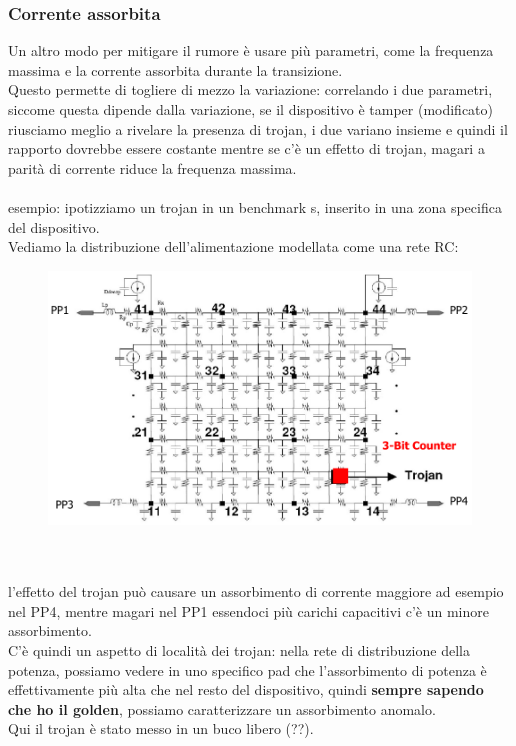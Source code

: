 \documentclass[oneside, 12pt]{extbook}
\begin{document}
\subsubsection{Corrente assorbita}
Un altro modo per mitigare il rumore è usare più parametri, come la frequenza massima e la corrente assorbita durante la transizione.
\\Questo permette di togliere di mezzo la variazione: correlando i due parametri, siccome questa dipende dalla variazione, se il dispositivo è tamper (modificato) riusciamo meglio a rivelare la presenza di trojan, i due variano insieme e quindi il rapporto dovrebbe essere costante mentre se c'è un effetto di trojan, magari a parità di corrente riduce la frequenza massima.
\\\\esempio: ipotizziamo un trojan in un benchmark s, inserito in una zona specifica del dispositivo.
\\Vediamo la distribuzione dell'alimentazione modellata come una rete RC:\\ 
\begin{figure}[!h]
	\includegraphics[scale=0.3]{immagini/hardware/alim_mod.png}
\end{figure}
\\\\l'effetto del trojan può causare un assorbimento di corrente maggiore ad esempio nel PP4, mentre magari nel PP1 essendoci più carichi capacitivi c'è un minore assorbimento.
\\C'è quindi un aspetto di località dei trojan: nella rete di distribuzione della potenza, possiamo vedere in uno specifico pad che l'assorbimento di potenza è effettivamente più alta che nel resto del dispositivo, quindi \textbf{sempre sapendo che ho il golden}, possiamo caratterizzare un assorbimento anomalo.
\\Qui il trojan è stato messo in un buco libero (??).
\end{document}

